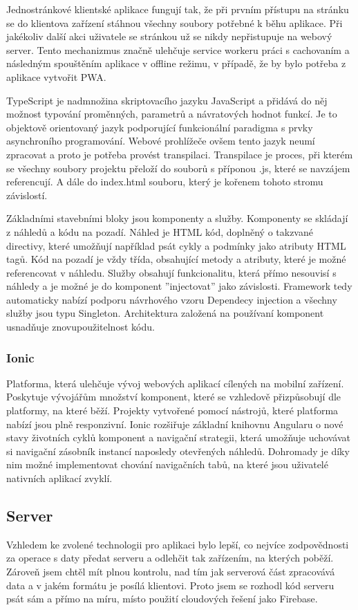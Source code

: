 \documentclass[
  biblatex,
  glossaries,
  index
]{kidiplom}
\begin{document}
Jednostránkové klientské aplikace fungují tak, že při prvním přístupu na stránku se do klientova zařízení stáhnou všechny soubory potřebné k běhu aplikace. Při jakékoliv další akci uživatele se stránkou už se nikdy nepřistupuje na webový server. Tento mechanizmus značně ulehčuje service workeru práci s cachovaním a následným spouštěním aplikace v offline režimu, v případě, že by bylo potřeba z aplikace vytvořit PWA.

TypeScript je nadmnožina skriptovacího jazyku JavaScript a přidává do něj možnost typování proměnných, parametrů a návratových hodnot funkcí. Je to objektově orientovaný jazyk podporující funkcionální paradigma s prvky asynchroního programování. Webové prohlížeče ovšem tento jazyk neumí zpracovat a proto je potřeba provést transpilaci. Transpilace je proces, při kterém se všechny soubory projektu přeloží do souborů s příponou .js, které se navzájem referencují. A dále do index.html souboru, který je kořenem tohoto stromu závislostí.

Základními stavebními bloky jsou komponenty a služby. Komponenty se skládají z náhledů a kódu na pozadí. Náhled je HTML kód, doplněný o takzvané directivy, které umožňují například psát cykly a podmínky jako atributy HTML tagů. Kód na pozadí je vždy třída, obsahující metody a atributy, které je možné referencovat v náhledu. Služby obsahují funkcionalitu, která přímo nesouvisí s náhledy a je možné je do komponent ''injectovat'' jako závislosti. \cite{8} Framework tedy automaticky nabízí podporu návrhového vzoru Dependecy injection a všechny služby jsou typu Singleton. Architektura založená na používaní komponent usnadňuje znovupoužitelnost kódu.

\subsubsection{Ionic}
Platforma, která ulehčuje vývoj webových aplikací cílených na mobilní zařízení. Poskytuje vývojářům množství komponent, které se vzhledově přizpůsobují dle platformy, na které běží. Projekty vytvořené pomocí nástrojů, které platforma nabízí jsou plně responzivní. Ionic rozšiřuje základní knihovnu Angularu o nové stavy životních cyklů komponent a navigační strategii, která umožňuje uchovávat si navigační zásobník instancí naposledy otevřených náhledů. Dohromady je díky nim možné implementovat chování navigačních tabů, na které jsou uživatelé nativních aplikací zvyklí. 

\subsection{Server}
Vzhledem ke zvolené technologii pro aplikaci bylo lepší, co nejvíce zodpovědnosti za operace s daty předat serveru a odlehčit tak zařízením, na kterých poběží. Zároveň jsem chtěl mít plnou kontrolu, nad tím jak serverová část zpracovává data a v jakém formátu je posílá klientovi. Proto jsem se rozhodl kód serveru psát sám a přímo na míru, místo použití cloudových řešení jako Firebase. 
\end{document}
